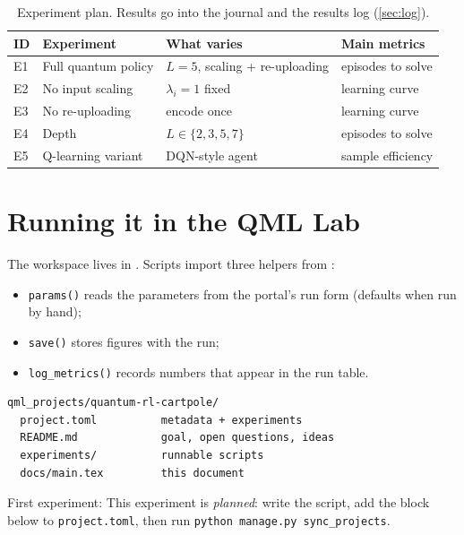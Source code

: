 \documentclass[11pt,a4paper]{article}
\begin{document}
\begin{table}[h]
\centering\small
\begin{tabularx}{\linewidth}{@{}l>{\raggedright}X>{\raggedright}X>{\raggedright\arraybackslash}X@{}}
\toprule
ID & Experiment & What varies & Main metrics \\
\midrule
  E1 & Full quantum policy & $L=5$, scaling + re-uploading & episodes to solve \\
  E2 & No input scaling & $\lambda_i=1$ fixed & learning curve \\
  E3 & No re-uploading & encode once & learning curve \\
  E4 & Depth & $L\in\{2,3,5,7\}$ & episodes to solve \\
  E5 & Q-learning variant & DQN-style agent & sample efficiency \\
\bottomrule
\end{tabularx}
\caption{Experiment plan. Results go into the journal and the results log (\cref{sec:log}).}
\end{table}

\section{Running it in the QML Lab}
The workspace lives in . Scripts import three helpers from
:
\begin{itemize}
  \item \texttt{params()} reads the parameters from the portal's run form (defaults when run by hand);
  \item \texttt{save()} stores figures with the run;
  \item \texttt{log\_metrics()} records numbers that appear in the run table.
\end{itemize}

\begin{lstlisting}
qml_projects/quantum-rl-cartpole/
  project.toml          metadata + experiments
  README.md             goal, open questions, ideas
  experiments/          runnable scripts
  docs/main.tex         this document
\end{lstlisting}

First experiment: This experiment is \emph{planned}: write the script, add the block below to \texttt{project.toml}, then run \texttt{python manage.py sync\_projects}.
\end{document}
